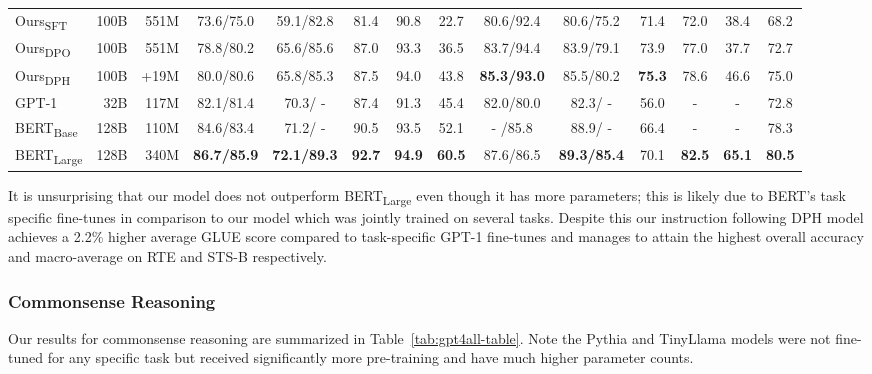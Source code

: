 \begin{table}[ht]
{\begin{tabular}{lrr|ccccccccc|cc}
Ours\textsubscript{SFT} & 100B & 551M
& 73.6/75.0 & 59.1/82.8 & 81.4 & 90.8 & 22.7 & 80.6/92.4 & 80.6/75.2 & 71.4 & 72.0 & 38.4 & 68.2 \\

Ours\textsubscript{DPO} & 100B & 551M
& 78.8/80.2 & 65.6/85.6 & 87.0 & 93.3 & 36.5 & 83.7/94.4 & 83.9/79.1 & 73.9 & 77.0 & 37.7 & 72.7 \\

Ours\textsubscript{DPH} & 100B & +19M
& 80.0/80.6 & 65.8/85.3 & 87.5 & 94.0 & 43.8 & \textbf{85.3/93.0} & 85.5/80.2 & \textbf{75.3} & 78.6 & 46.6 & 75.0 \\
\hline
GPT-1 & 32B & 117M
& 82.1/81.4 & 70.3/  -  & 87.4 & 91.3 & 45.4 & 82.0/80.0 & 82.3/  -  & 56.0 & -    & -    & 72.8 \\

BERT\textsubscript{Base} & 128B & 110M
& 84.6/83.4 & 71.2/  -  & 90.5 & 93.5 & 52.1 & -  /85.8  & 88.9/  -  & 66.4 & -    & -    & 78.3 \\

BERT\textsubscript{Large} & 128B & 340M
& \textbf{86.7/85.9} & \textbf{72.1/89.3} & \textbf{92.7 }& \textbf{94.9} & \textbf{60.5} & 87.6/86.5 & \textbf{89.3/85.4} & 70.1 & \textbf{82.5} & \textbf{65.1} & \textbf{80.5} \\
\hline
\end{tabular}}
\label{tab:glue-table}
\vspace*{-0.5\baselineskip}
\end{table}
\endgroup

It is unsurprising that our model does not outperform BERT\textsubscript{Large} even though it has more parameters; this is likely due to BERT's task specific fine-tunes in comparison to our model which was jointly trained on several tasks. Despite this our instruction following DPH model achieves a 2.2\% higher average GLUE score compared to task-specific GPT-1 fine-tunes and manages to attain the highest overall accuracy and macro-average on RTE and STS-B respectively.


\subsubsection{Commonsense Reasoning}
Our results for commonsense reasoning are summarized in Table~\ref{tab:gpt4all-table}. Note the Pythia \cite{biderman2023pythia} and TinyLlama \cite{zhang2024tinyllama} models were not fine-tuned for any specific task but received significantly more pre-training and have much higher parameter counts.

